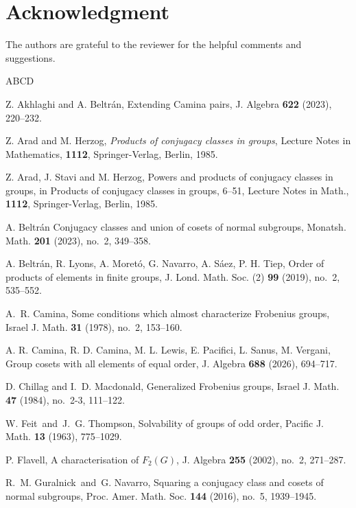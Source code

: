 \documentclass[twoside,a4paper,reqno,11pt]{amsart}
\newcommand{\<}{\langle}
\renewcommand{\>}{\rangle}
\renewcommand{\:}{\colon}
\theoremstyle{definition}
\begin{document}
\section*{Acknowledgment}  The authors are grateful to the reviewer for the helpful comments and  suggestions.

\begin{thebibliography}{ABCD}

 Z. Akhlaghi and A. Beltr\'an, Extending Camina pairs, J. Algebra {\bf 622} (2023), 220--232.

 Z. Arad and M. Herzog, {\it Products of conjugacy classes in groups}, Lecture Notes in Mathematics, \textbf{1112}, Springer-Verlag, Berlin, 1985.

  Z. Arad,  J. Stavi and M. Herzog, Powers and products of conjugacy classes in groups, in {Products of conjugacy classes in groups}, 6--51, Lecture Notes in Math., \textbf{1112}, Springer-Verlag, Berlin, 1985.

 A. Beltr\'an Conjugacy classes and union of cosets of normal subgroups, Monatsh. Math. {\bf 201} (2023), no.~2, 349--358.

 A. Beltr\'an, R. Lyons, A. Moret\'{o}, G. Navarro, A. S\'{a}ez, P. H. Tiep, Order of products of elements in finite groups, J. Lond. Math. Soc. (2) {\bf 99} (2019), no.~2, 535--552. 


 A.~R. Camina, Some conditions which almost characterize Frobenius groups, Israel J. Math. {\bf 31} (1978), no.~2, 153--160.

 A. R. Camina, R. D. Camina, M. L. Lewis, E. Pacifici, L. Sanus, M. Vergani, Group cosets with all elements of equal order,  J. Algebra {\bf 688} (2026), 694--717.

D. Chillag and I.~D. Macdonald, Generalized Frobenius groups, Israel J. Math. {\bf 47} (1984), no.~2-3, 111--122.

 W. Feit\ and\ J.~G. Thompson, Solvability of groups of odd order, Pacific J. Math. {\bf 13} (1963), 775--1029.


 P. Flavell, A characterisation of $F_2(G)$, J. Algebra {\bf 255} (2002), no.~2, 271--287.

 R.~M. Guralnick\ and\ G. Navarro, Squaring a conjugacy class and cosets of normal subgroups, Proc. Amer. Math. Soc. {\bf 144} (2016), no.~5, 1939--1945.


\end{thebibliography}
\end{document}
